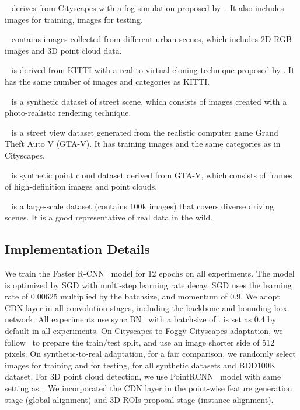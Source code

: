 \documentclass[runningheads]{llncs}
\begin{document}
~\cite{SDV18} derives from Cityscapes with a fog simulation proposed by~\cite{SDV18}. It also includes  images for training,  images for testing.

~\cite{Geiger2012CVPR} contains  images collected from different urban scenes, which includes 2D RGB images and 3D point cloud data.

~\cite{gaidon2016virtual} is derived from KITTI with a  real-to-virtual cloning technique proposed by \cite{gaidon2016virtual}. It has the same number of images and categories as KITTI.


~\cite{wrenninge2018synscapes} is a synthetic dataset of street scene, which consists of  images created with a photo-realistic rendering technique.

~\cite{johnson2016driving} is a street view dataset generated from the realistic computer game Grand Theft Auto V (GTA-V).
It has  training images and the same categories as in Cityscapes.

~\cite{hurl2019precise} is synthetic point cloud dataset derived from GTA-V, which
consists of  frames of high-definition images and point clouds.

 ~\cite{yu2018bdd100k} is a large-scale dataset (contains 100k images) that covers diverse driving scenes.
It is a good representative of real data in the wild.



\subsection{Implementation Details} \label{Implementation}
We train the Faster R-CNN~\cite{ren2015faster} model for 12 epochs on all experiments. The model is optimized by SGD with multi-step learning rate decay.
SGD uses the learning rate of 0.00625 multiplied by the batchsize, and momentum of 0.9.
We adopt CDN layer in all convolution stages, including the backbone and bounding box network.
All experiments use sync BN~\cite{peng2018megdet} with a batchsize of .
 is set as 0.4 by default in all experiments.
On Cityscapes to Foggy Cityscapes adaptation, we follow~\cite{Saito_2019_CVPR,Zhu_2019_CVPR}
to prepare the train/test split, and use an image shorter side of 512 pixels.
On synthetic-to-real adaptation,
for a fair comparison, we randomly select  images for training and  for testing, for all synthetic datasets and BDD100K dataset.
For 3D point cloud detection, we use PointRCNN~\cite{shi2019pointrcnn} model with same setting as~\cite{shi2019pointrcnn}.
We incorporated the CDN layer in the point-wise feature generation stage (global alignment) and 3D ROIs proposal stage (instance alignment).
\end{document}
